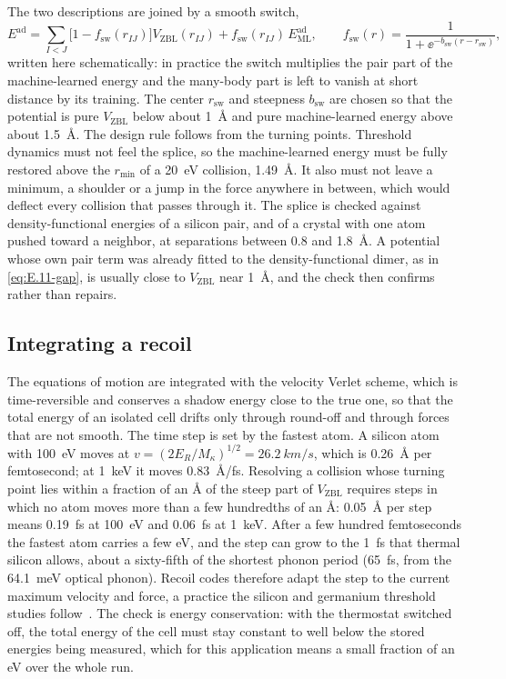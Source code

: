 The two descriptions are joined by a smooth switch,
\begin{equation}
  E^{\mathrm{ad}} = \sum_{I<J}\bigl[1 - f_{\mathrm{sw}}(r_{IJ})\bigr]V_{\mathrm{ZBL}}(r_{IJ}) + f_{\mathrm{sw}}(r_{IJ})\,E^{\mathrm{ad}}_{\mathrm{ML}},
  \qquad f_{\mathrm{sw}}(r) = \frac{1}{1 + \ee^{-b_{\mathrm{sw}}(r - r_{\mathrm{sw}})}},
  \label{eq:E.11-splice}
\end{equation}
written here schematically: in practice the switch multiplies the pair part of the machine-learned energy and the many-body part is left to vanish at short distance by its training. The center $r_{\mathrm{sw}}$ and steepness $b_{\mathrm{sw}}$ are chosen so that the potential is pure $V_{\mathrm{ZBL}}$ below about \SI{1}{\angstrom} and pure machine-learned energy above about \SI{1.5}{\angstrom}. The design rule follows from the turning points. Threshold dynamics must not feel the splice, so the machine-learned energy must be fully restored above the $r_{\mathrm{min}}$ of a \SI{20}{eV} collision, \SI{1.49}{\angstrom}. It also must not leave a minimum, a shoulder or a jump in the force anywhere in between, which would deflect every collision that passes through it. The splice is checked against density-functional energies of a silicon pair, and of a crystal with one atom pushed toward a neighbor, at separations between 0.8 and \SI{1.8}{\angstrom}. A potential whose own pair term was already fitted to the density-functional dimer, as in \cref{eq:E.11-gap}, is usually close to $V_{\mathrm{ZBL}}$ near \SI{1}{\angstrom}, and the check then confirms rather than repairs.

\subsection{Integrating a recoil}

The equations of motion are integrated with the velocity Verlet scheme, which is time-reversible and conserves a shadow energy close to the true one, so that the total energy of an isolated cell drifts only through round-off and through forces that are not smooth. The time step is set by the fastest atom. A silicon atom with \SI{100}{eV} moves at $v = (2E_R/M_\kappa)^{1/2} = \SI{26.2}{km/s}$, which is \SI{0.26}{\angstrom} per femtosecond; at \SI{1}{keV} it moves \SI{0.83}{\angstrom/fs}. Resolving a collision whose turning point lies within a fraction of an \si{\angstrom} of the steep part of $V_{\mathrm{ZBL}}$ requires steps in which no atom moves more than a few hundredths of an \si{\angstrom}: \SI{0.05}{\angstrom} per step means \SI{0.19}{fs} at \SI{100}{eV} and \SI{0.06}{fs} at \SI{1}{keV}. After a few hundred femtoseconds the fastest atom carries a few eV, and the step can grow to the \SI{1}{fs} that thermal silicon allows, about a sixty-fifth of the shortest phonon period (\SI{65}{fs}, from the \SI{64.1}{meV} optical phonon). Recoil codes therefore adapt the step to the current maximum velocity and force, a practice the silicon and germanium threshold studies follow~\cite[Table~I]{sassi2022energy}. The check is energy conservation: with the thermostat switched off, the total energy of the cell must stay constant to well below the stored energies being measured, which for this application means a small fraction of an eV over the whole run.

